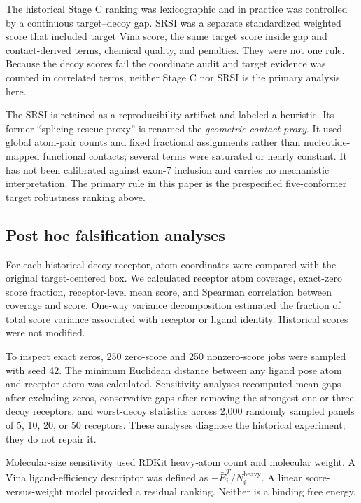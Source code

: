 \documentclass[journal]{IEEEtran}
\begin{document}
The historical Stage C ranking was lexicographic and in practice was
controlled by a continuous target--decoy gap. SRSI was a separate
standardized weighted score that included target Vina score, the same
target score inside gap and contact-derived terms, chemical quality, and
penalties. They were not one rule. Because the decoy scores fail the
coordinate audit and target evidence was counted in correlated terms,
neither Stage C nor SRSI is the primary analysis here.

The SRSI is retained as a reproducibility artifact and labeled a
heuristic. Its former ``splicing-rescue proxy'' is renamed the
\emph{geometric contact proxy}. It used global atom-pair counts and
fixed fractional assignments rather than nucleotide-mapped functional
contacts; several terms were saturated or nearly constant. It has not
been calibrated against exon-7 inclusion and carries no mechanistic
interpretation. The primary rule in this paper is the prespecified
five-conformer target robustness ranking above.

\subsection{Post hoc falsification analyses}

For each historical decoy receptor, atom coordinates were compared with
the original target-centered box. We calculated receptor atom coverage,
exact-zero score fraction, receptor-level mean score, and Spearman
correlation between coverage and score. One-way variance decomposition
estimated the fraction of total score variance associated with receptor
or ligand identity. Historical scores were not modified.

To inspect exact zeros, 250 zero-score and 250 nonzero-score jobs were
sampled with seed 42. The minimum Euclidean distance between any ligand
pose atom and receptor atom was calculated. Sensitivity analyses
recomputed mean gaps after excluding zeros, conservative gaps after
removing the strongest one or three decoy receptors, and worst-decoy
statistics across 2,000 randomly sampled panels of 5, 10, 20, or 50
receptors. These analyses diagnose the historical experiment; they do
not repair it.

Molecular-size sensitivity used RDKit heavy-atom count and molecular
weight. A Vina ligand-efficiency descriptor was defined as
$-\bar E_i^T/N_i^{\mathrm{heavy}}$. A linear score-versus-weight model
provided a residual ranking. Neither is a binding free energy.
\end{document}
